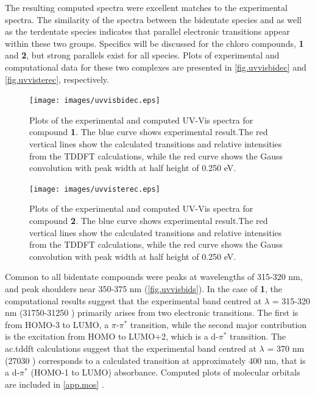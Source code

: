 The resulting computed spectra were excellent matches to the experimental spectra. The similarity of the spectra between the bidentate species and as well as the terdentate species indicates that parallel electronic transitions appear within these two groups. Specifics will be discussed for the chloro compounds, \textbf{1} and \textbf{2}, but strong parallels exist for all species. Plots of experimental and computational data for these two complexes are presented in \autoref{fig.uvvisbidec} and \autoref{fig.uvvisterec}, respectively.

\begin{figure}[!htb]
 \centering
  \texttt{[image: images/uvvisbidec.eps]}
 \caption[Plots of the experimental and computed UV-Vis spectra for compound \textbf{1}]{Plots of the experimental and computed UV-Vis spectra for compound \textbf{1}. The blue curve shows experimental result.The red vertical lines show the calculated transitions and relative intensities from the TDDFT calculations, while the red curve shows the Gauss convolution with peak width at half height of 0.250 eV.}
 \label{fig.uvvisbidec}
\end{figure}

\begin{figure}[!htb]
 \centering
  \texttt{[image: images/uvvisterec.eps]}
 \caption[Plots of the experimental and computed UV-Vis spectra for compound \textbf{2}]{Plots of the experimental and computed UV-Vis spectra for compound \textbf{2}.  The blue curve shows experimental result.The red vertical lines show the calculated transitions and relative intensities from the TDDFT calculations, while the red curve shows the Gauss convolution with peak width at half height of 0.250 eV.}
 \label{fig.uvvisterec}
\end{figure}

Common to all bidentate compounds were peaks at wavelengths of 315-320 nm, and peak shoulders near 350-375 nm (\autoref{fig.uvvisbids}). In the case of \textbf{1}, the computational results suggest that the experimental band centred at $\lambda$ = 315-320 nm (31750-31250 ) primarily arises from two electronic transitions. The first is from HOMO-3 to LUMO, a $\pi$-$\pi^\ast$ transition, while the second major contribution is the excitation from HOMO to LUMO+2, which is a d-$\pi^\ast$ transition. The \gls{ac.tddft} calculations suggest that the experimental band centred at $\lambda$ = 370 nm (27030 ) corresponds to a calculated transition at approximately 400 nm, that is a d-$\pi^\ast$ (HOMO-1 to LUMO) absorbance. Computed plots of molecular orbitals are included in \autoref{app.mos} .

